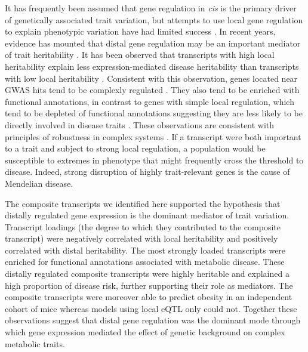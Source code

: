 \documentclass[
]{article}
\begin{document}
It has frequently been assumed that gene regulation in \textit{cis} is
the primary driver of genetically associated trait variation, but
attempts to use local gene regulation to explain phenotypic variation
have had limited success \cite{pmid32912663, pmid36515579}. In recent
years, evidence has mounted that distal gene regulation may be an
important mediator of trait heritability \cite{pmid32424349, 
pmid37857933, pmid31051098}. It has been observed that transcripts with
high local heritability explain less expression-mediated disease
heritability than transcripts with low local heritability
\cite{pmid32424349}. Consistent with this observation, genes located
near GWAS hits tend to be complexly regulated \cite{pmid37857933}. They
also tend to be enriched with functional annotations, in contrast to
genes with simple local regulation, which tend to be depleted of
functional annotations suggesting they are less likely to be directly
involved in disease traits \cite{pmid37857933}. These observations are
consistent with principles of robustness in complex systems
\cite{pmid29782925, pmid12082173, pmid27304973}. If a transcript were
both important to a trait and subject to strong local regulation, a
population would be susceptible to extremes in phenotype that might
frequently cross the threshold to disease. Indeed, strong disruption of
highly trait-relevant genes is the cause of Mendelian disease.

The composite transcripts we identified here supported the hypothesis
that distally regulated gene expression is the dominant mediator of
trait variation. Transcript loadings (the degree to which they
contributed to the composite transcript) were negatively correlated with
local heritability and positively correlated with distal heritability.
The most strongly loaded transcripts were enriched for functional
annotations associated with metabolic disease. These distally regulated
composite transcripts were highly heritable and explained a high
proportion of disease risk, further supporting their role as mediators.
The composite transcripts were moreover able to predict obesity in an
independent cohort of mice whereas models using local eQTL only could
not. Together these observations suggest that distal gene regulation was
the dominant mode through which gene expression mediated the effect of
genetic background on complex metabolic traits.
\end{document}

